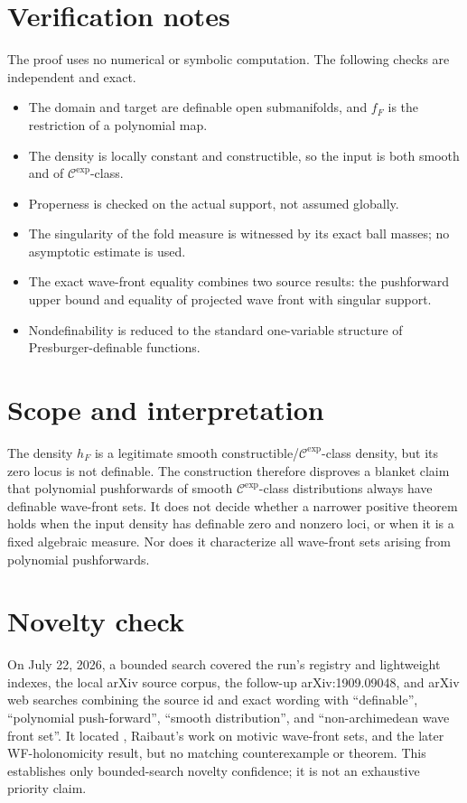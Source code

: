 \documentclass[11pt]{article}
\newcommand{\cCexp}{\mathcal C^{\mathrm{exp}}}
\begin{document}
\section{Verification notes}

The proof uses no numerical or symbolic computation.  The following checks
are independent and exact.
\begin{itemize}
\item The domain and target are definable open submanifolds, and \(f_F\) is
the restriction of a polynomial map.
\item The density is locally constant and constructible, so the input is both
smooth and of \(\cCexp\)-class.
\item Properness is checked on the actual support, not assumed globally.
\item The singularity of the fold measure is witnessed by its exact ball
masses; no asymptotic estimate is used.
\item The exact wave-front equality combines two source results: the
pushforward upper bound and equality of projected wave front with singular
support.
\item Nondefinability is reduced to the standard one-variable structure of
Presburger-definable functions.
\end{itemize}

\section{Scope and interpretation}

The density \(h_F\) is a legitimate smooth constructible/\(\cCexp\)-class
density, but its zero locus is not definable.  The construction therefore
disproves a blanket claim that polynomial pushforwards of smooth
\(\cCexp\)-class distributions always have definable wave-front sets.  It
does not decide whether a narrower positive theorem holds when the input
density has definable zero and nonzero loci, or when it is a fixed algebraic
measure.  Nor does it characterize all wave-front sets arising from
polynomial pushforwards.

\section{Novelty check}

On July 22, 2026, a bounded search covered the run's registry and lightweight
indexes, the local arXiv source corpus, the follow-up arXiv:1909.09048, and
arXiv web searches combining the source id and exact wording with
``definable'', ``polynomial push-forward'', ``smooth distribution'', and
``non-archimedean wave front set''.  It located \cite{CHLR}, Raibaut's work on
motivic wave-front sets, and the later WF-holonomicity result, but no matching
counterexample or theorem.  This establishes only bounded-search novelty
confidence; it is not an exhaustive priority claim.
\end{document}
